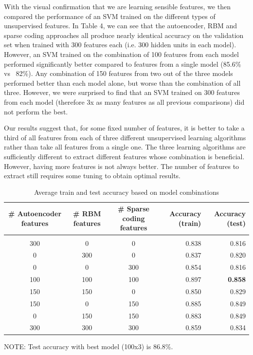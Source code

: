 \documentclass{article} %
\begin{document}
With the visual confirmation that we are learning sensible features, we then compared the performance of an SVM trained on the different types of unsupervised features. In Table 4, we can see that the autoencoder, RBM and sparse coding approaches all produce nearly identical accuracy on the validation set when trained with 300 features each (i.e. 300 hidden units in each model). However, an SVM trained on the combination of 100 features from each model performed significantly better compared to features from a single model (85.6\% vs ~82\%). Any combination of 150 features from two out of the three models performed better than each model alone, but worse than the combination of all three. However, we were surprised to find that an SVM trained on 300 features from each model (therefore 3x as many features as all previous comparisons) did not perform the best. 

Our results suggest that, for some fixed number of features, it is better to take a third of all features from each of three different unsupervised learning algorithms rather than take all features from a single one. The three learning algorithms are sufficiently different to extract different  features whose combination is beneficial. However, having more features is not always better. The number of features to extract still requires some tuning to obtain optimal results.




\begin{table}[h]
\caption{Average train and test accuracy based on model combinations}
\label{results-table}
\begin{center}
\begin{adjustbox}{width=1\textwidth}
\begin{tabular}{ccc|rr}

\multicolumn{1}{c}{\bf \# Autoencoder features}  
&\multicolumn{1}{c}{\bf \# RBM features}  
&\multicolumn{1}{c}{\bf \# Sparse coding features} 
&\multicolumn{1}{|r}{\bf Accuracy (train)}
&\multicolumn{1}{r}{\bf Accuracy (test)}
\\ \hline \\	
300 & 0 & 0 & 0.838 & 0.816 \\
0 & 300 & 0 & 0.837 & 0.820 \\
0 & 0 & 300 & 0.854 & 0.816  \\
100 & 100 & 100 & 0.897 & \textbf{0.858} \\
150 & 150 & 0 & 0.850 & 0.829 \\
150 & 0 & 150 & 0.885 & 0.849 \\
0 & 150 & 150 & 0.883& 0.849 \\
300 & 300 & 300 & 0.859 & 0.834 \\

\end{tabular}
\end{adjustbox}
\end{center}
\end{table}

NOTE: Test accuracy with best model (100x3) is 86.8\%.
\end{document}
